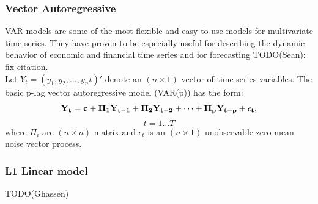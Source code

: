 \subsubsection{Vector Autoregressive}
VAR models are some of the most flexible and easy to use models for multivariate time series. They have proven to be especially useful for describing the dynamic behavior of economic and financial time series and for forecasting \cite{tsay, VAR} TODO(Sean): fix citation. \\
Let $Y_t = (y_1, y_2,...,y_nt)'$ denote an $(n \times 1)$ vector of time series variables. The basic p-lag vector autoregressive model (VAR(p)) has the form:
$$\bf{Y}_t=\bf{c}+\bf{\Pi}_1\bf{Y}_{t-1}+\bf{\Pi}_2\bf{Y}_{t-2}+\cdots+\bf{\Pi}_p\bf{Y}_{t-p}+\epsilon_t,$$ $$t=1\ldots T$$
where $\Pi_i$ are $(n \times n)$ matrix and $\epsilon_t$ is an $(n \times 1)$ unobservable zero mean noise vector process.

\subsubsection{L1 Linear model}

TODO(Ghassen)

